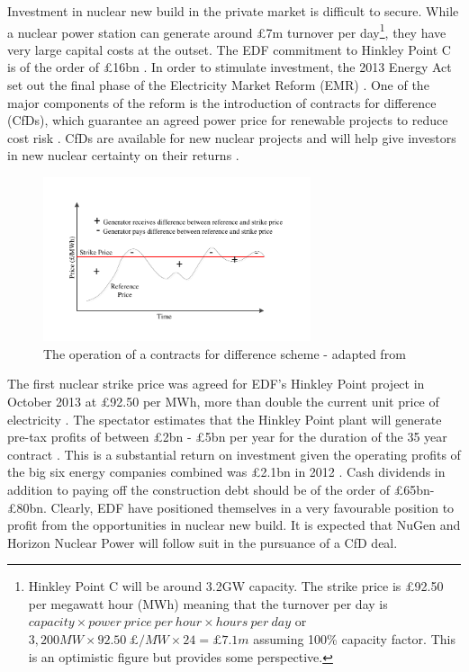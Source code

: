 Investment in nuclear new build in the private market is difficult to secure.
While a nuclear power station can generate around \pounds7m turnover per day\footnote{Hinkley Point C will be around 3.2GW capacity. The strike price is \pounds92.50 per megawatt hour (MWh) meaning that the turnover per day is $capacity \times power~price~per~hour \times hours~per~day$ or $ 3,200MW \times 92.50~\pounds/MW \times 24 = \pounds7.1m$ assuming 100\% capacity factor. This is an optimistic figure but provides some perspective.}, they have very large capital costs at the outset.
The EDF commitment to Hinkley Point C is of the order of \pounds16bn \cite{Spectator14}.
In order to stimulate investment, the 2013 Energy Act set out the final phase of the Electricity Market Reform (EMR) \cite{EnergyAct13}.
One of the major components of the reform is the introduction of contracts for difference (CfDs), which guarantee an agreed power price for renewable projects to reduce cost risk \cite{Baringa}.
CfDs are available for new nuclear projects and will help give investors in new nuclear certainty on their returns \cite{Baringa}.

\begin{figure}[!h]
\centering
\includegraphics[width = 0.7\textwidth]{Figures/CfDs.pdf}
\caption{The operation of a contracts for difference scheme - adapted from \cite{Baringa}}
\label{figure:CfD}
\end{figure}


The first nuclear strike price was agreed for EDF's Hinkley Point project in October 2013 at \pounds92.50 per MWh, more than double the current unit price of electricity \cite{BBCnewsHinkley}. 
The spectator estimates that the Hinkley Point plant will generate pre-tax profits of between \pounds2bn - \pounds5bn per year for the duration of the 35 year contract \cite{Spectator14}.
This is a substantial return on investment given the operating profits of the big six energy companies combined was \pounds2.1bn in 2012 \cite{Spectator14}.
Cash dividends in addition to paying off the construction debt should be of the order of \pounds65bn-\pounds80bn.
Clearly, EDF have positioned themselves in a very favourable position to profit from the opportunities in nuclear new build.
It is expected that NuGen and Horizon Nuclear Power will follow suit in the pursuance of a CfD deal.


